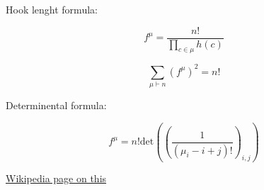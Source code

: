 \documentclass[12pt]{amsart}
\begin{document}
\begin{mdframed}[linecolor=red!20, linewidth=3pt]
	\begin{minipage}[t]{5.5cm}
		 \begin{bf}Hook lenght formula:\end{bf}
		\vspace{3pt}  \begin{equation}f^\mu=\frac{n!}{\prod_{c\in\mu}h(c)}
		 \end{equation}
	 \end{minipage}
	 \begin{minipage}[t]{6cm}
		\vspace{7pt} \begin{equation}\sum_{\mu\vdash n}(f^\mu)^2=n!\end{equation}
	 \end{minipage}
	 \begin{minipage}[t]{8cm}
		 \begin{bf}Determinental formula:\end{bf}
		 \begin{equation}f^\mu=n!\textrm{det}\left(\left(\frac{1}{(\mu_i-i+j)!}\right)_{i,j}\right)
		 \end{equation}
	 \end{minipage}
	  \hyperref[tab]{Wikipedia page on this} 
 \end{mdframed}
\end{document}

